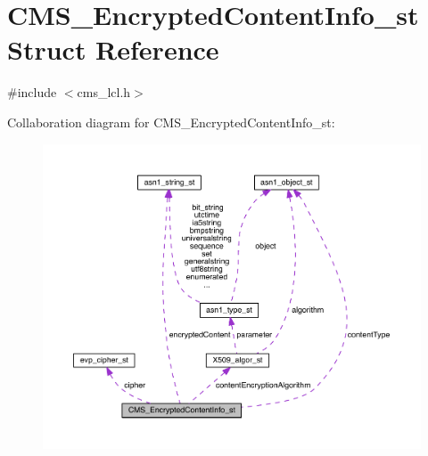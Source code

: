 \hypertarget{struct_c_m_s___encrypted_content_info__st}{}\section{C\+M\+S\+\_\+\+Encrypted\+Content\+Info\+\_\+st Struct Reference}
\label{struct_c_m_s___encrypted_content_info__st}


{\ttfamily \#include $<$cms\+\_\+lcl.\+h$>$}



Collaboration diagram for C\+M\+S\+\_\+\+Encrypted\+Content\+Info\+\_\+st\+:\nopagebreak
\begin{figure}[H]
\begin{center}
\leavevmode
\includegraphics[width=350pt]{struct_c_m_s___encrypted_content_info__st__coll__graph}
\end{center}
\end{figure}
